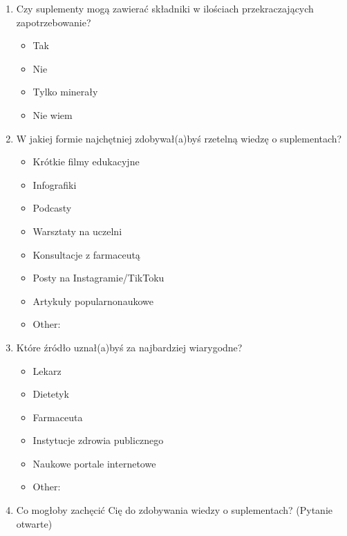 \begin{appendices}
\begin{enumerate}
    \item Czy suplementy mogą zawierać składniki w ilościach przekraczających zapotrzebowanie?
    \begin{itemize}
        \item Tak
        \item Nie
        \item Tylko minerały
        \item Nie wiem
    \end{itemize}

    \item W jakiej formie najchętniej zdobywał(a)byś rzetelną wiedzę o suplementach?
    \begin{itemize}
        \item Krótkie filmy edukacyjne
        \item Infografiki
        \item Podcasty
        \item Warsztaty na uczelni
        \item Konsultacje z farmaceutą
        \item Posty na Instagramie/TikToku
        \item Artykuły popularnonaukowe
        \item Other:
    \end{itemize}

    \item Które źródło uznał(a)byś za najbardziej wiarygodne?
    \begin{itemize}
        \item Lekarz
        \item Dietetyk
        \item Farmaceuta
        \item Instytucje zdrowia publicznego
        \item Naukowe portale internetowe
        \item Other:
    \end{itemize}

    \item Co mogłoby zachęcić Cię do zdobywania wiedzy o suplementach? (Pytanie otwarte)

\end{enumerate}

\end{appendices}

